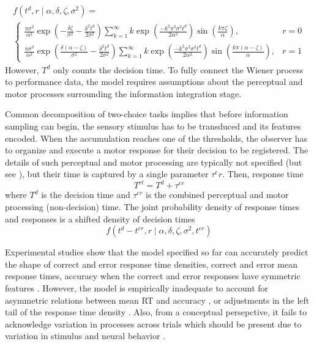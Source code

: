 \documentclass[12pt]{article}
\begin{document}
\begin{gather}
\label{eq:wd}
f(t^d, r \mid \alpha, \delta, \zeta, \sigma^2) = \nonumber \\
\begin{cases}
\frac{\pi\sigma^2}{\alpha^2}\operatorname{exp}(-\frac{\delta\zeta}{\sigma^2}-\frac{\delta^2t^d}{2\sigma^2})\sum_{k=1}^\infty{k\operatorname{exp}(\frac{-k^2\pi^2\sigma^2t^d}{2\alpha^2})\operatorname{sin}(\frac{k\pi\zeta}{\alpha})}, & r = 0\\
\frac{\pi\sigma^2}{\alpha^2}\operatorname{exp}(\frac{\delta(\alpha - \zeta)}{\sigma^2}-\frac{\delta^2t^d}{2\sigma^2})\sum_{k=1}^\infty{k\operatorname{exp}(\frac{-k^2\pi^2\sigma^2t^d}{2\alpha^2})\operatorname{sin}(\frac{k\pi(\alpha - \zeta)}{\alpha})}, & r = 1
\end{cases}
\end{gather}
However, $T^d$ only counts the decision time. To fully connect the Wiener process to performance data, the model requires assumptions about the perceptual and motor processes surrounding the information integration stage.

	Common decomposition of two-choice tasks implies that before information sampling can begin, the sensory stimulus has to be transduced and its features encoded. When the accumulation reaches one of the thresholds, the observer has to organize and execute a motor response for their decision to be registered. The details of such perceptual and motor processing are typically not specified (but see \citet{SmiRat2009}), but their time is captured by a single parameter $\tau^er$. Then, response time
\begin{equation}
T^{rt} = T^d + \tau^{er}
\end{equation}
where $T^d$ is the decision time and $\tau^{er}$ is the combined perceptual and motor processing (non-decision) time. The joint probability density of response times and responses is a shifted density of decision times
\begin{equation}
f(t^d - t^{er}, r \mid \alpha, \delta, \zeta, \sigma^2, t^{er})
\end{equation}

	Experimental studies show that the model specified so far can accurately predict the shape of correct and error response time densities, correct and error mean response times, accuracy when the correct and error responses have symmetric features \citep{RatMck2008}. However, the model is empirically inadequate to account for asymmetric relations between mean RT and accuracy \citep{RatRou1998}, or adjustments in the left tail of the response time density \citep{RatTue2002}. Also, from a conceptual persepctive, it fails to acknowledge variation in processes across trials which should be present due to variation in stimulus and neural behavior \citep{DayAbb2001}.
    
\end{document}
